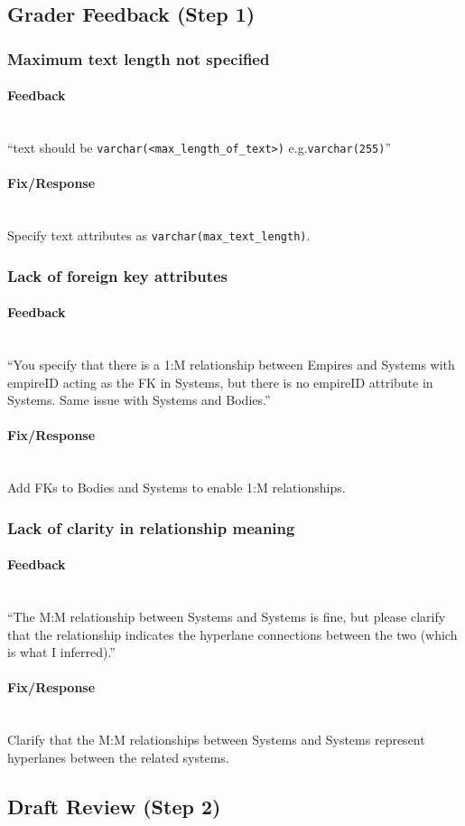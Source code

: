 \documentclass[12pt]{article}
\newcommand{\hparagraph}[1]{\paragraph{#1}\mbox{}\vspace{0.75em}\\}
\begin{document}
\begin{appendices}
\subsection{Grader Feedback (Step 1)}
\subsubsection{Maximum text length not specified}
\hparagraph{Feedback}
“text should be \texttt{varchar(<max\_length\_of\_text>)} e.g.\texttt{varchar(255)}”
\hparagraph{Fix/Response}
Specify text attributes as \texttt{varchar(max\_text\_length)}.

\subsubsection{Lack of foreign key attributes}
\hparagraph{Feedback}
“You specify that there is a 1:M relationship between Empires and Systems with empireID acting as the FK in Systems, but there is no empireID attribute in Systems. Same issue with Systems and Bodies.”
\hparagraph{Fix/Response}
Add FKs to Bodies and Systems to enable 1:M relationships.

\subsubsection{Lack of clarity in relationship meaning}
\hparagraph{Feedback}
“The M:M relationship between Systems and Systems is fine, but please clarify that the relationship indicates the hyperlane connections between the two (which is what I inferred).”
\hparagraph{Fix/Response}
Clarify that the M:M relationships between Systems and Systems represent hyperlanes between the related systems.

\newpage
\subsection{Draft Review (Step 2)}

\end{appendices}
\end{document}
